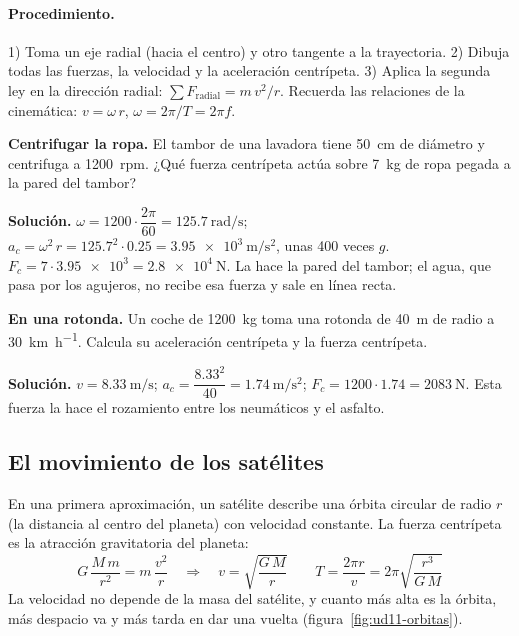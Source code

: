 \paragraph{Procedimiento.} 1) Toma un eje radial (hacia el centro) y otro tangente a la trayectoria. 2) Dibuja todas las fuerzas, la
velocidad y la aceleración centrípeta. 3) Aplica la segunda ley en la dirección radial: \(\sum F_{\text{radial}} = m\,v^2/r\). Recuerda
las relaciones de la cinemática: \(v = \omega\,r\), \(\omega = 2\pi/T = 2\pi f\).

\begin{example}
    \textbf{Centrifugar la ropa.} El tambor de una lavadora tiene \qty{50}{\cm} de diámetro y centrifuga a \qty{1200}{rpm}. ¿Qué
    fuerza centrípeta actúa sobre \qty{7}{\kg} de ropa pegada a la pared del tambor?

    \textbf{Solución.} \(\omega = 1200 \cdot \dfrac{2\pi}{60} = \qty{125.7}{\radian\per\s}\);
    \(a_c = \omega^2\,r = \num{125.7}^2 \cdot \num{0.25} = \qty{3.95e3}{\m\per\s\squared}\), unas 400 veces \(g\).
    \(F_c = 7 \cdot \num{3.95e3} = \qty{2.8e4}{\newton}\). La hace la pared del tambor; el agua, que pasa por los agujeros, no recibe
    esa fuerza y sale en línea recta.
\end{example}

\begin{example}
    \textbf{En una rotonda.} Un coche de \qty{1200}{\kg} toma una rotonda de \qty{40}{\m} de radio a \qty{30}{\km\per\hour}. Calcula
    su aceleración centrípeta y la fuerza centrípeta.

    \textbf{Solución.} \(v = \qty{8.33}{\m\per\s}\); \(a_c = \dfrac{\num{8.33}^2}{40} = \qty{1.74}{\m\per\s\squared}\);
    \(F_c = 1200 \cdot \num{1.74} = \qty{2083}{\newton}\). Esta fuerza la hace el rozamiento entre los neumáticos y el asfalto.
\end{example}

\subsection{El movimiento de los satélites}

En una primera aproximación, un satélite describe una órbita circular de radio \(r\) (la distancia al centro del planeta) con
velocidad constante. La fuerza centrípeta es la atracción gravitatoria del planeta:
\[ G\,\frac{M\,m}{r^2} = m\,\frac{v^2}{r} \quad\Longrightarrow\quad v = \sqrt{\frac{G\,M}{r}} \qquad T = \frac{2\pi r}{v} = 2\pi\sqrt{\frac{r^3}{G\,M}} \]
La velocidad no depende de la masa del satélite, y cuanto más alta es la órbita, más despacio va y más tarda en dar una vuelta
(figura~\ref{fig:ud11-orbitas}).

